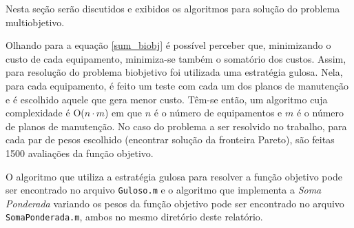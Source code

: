 Nesta seção serão discutidos e exibidos os algoritmos para solução do problema multiobjetivo.

Olhando para a equação \ref{sum_biobj} é possível perceber que, minimizando o custo de cada equipamento, minimiza-se também o somatório dos custos. Assim, para resolução do problema biobjetivo foi utilizada uma estratégia gulosa. Nela, para cada equipamento, é feito um teste com cada um dos planos de manutenção e é escolhido aquele que gera menor custo. Têm-se então, um algoritmo cuja complexidade é O($n\cdot m$) em que $n$ é o número de equipamentos e $m$ é o número de planos de manutenção. No caso do problema a ser resolvido no trabalho, para cada par de pesos escolhido (encontrar solução da fronteira Pareto), são feitas 1500 avaliações da função objetivo.

O algoritmo que utiliza a estratégia gulosa para resolver a função objetivo pode ser encontrado no arquivo \texttt{Guloso.m} e o algoritmo que implementa a \emph{Soma Ponderada} variando os pesos da função objetivo pode ser encontrado no arquivo \texttt{SomaPonderada.m}, ambos no mesmo diretório deste relatório.